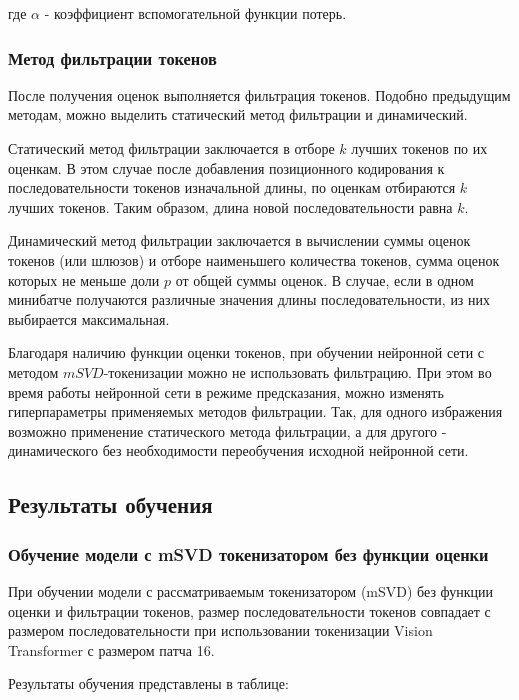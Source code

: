 \documentclass[times,specification,annotation]{itmo-student-thesis}
\begin{document}
где $\alpha$ - коэффициент вспомогательной функции потерь.

\subsubsection{Метод фильтрации токенов}
После получения оценок выполняется фильтрация токенов. Подобно предыдущим методам, можно выделить статический метод фильтрации и динамический.

Статический метод фильтрации заключается в отборе $k$ лучших токенов по их оценкам. В этом случае после добавления позиционного кодирования к последовательности токенов изначальной длины, по оценкам отбираются $k$ лучших токенов. Таким образом, длина новой последовательности равна $k$.

Динамический метод фильтрации заключается в вычислении суммы оценок токенов (или шлюзов) и отборе наименьшего количества токенов, сумма оценок которых не меньше доли $p$ от общей суммы оценок. В случае, если в одном минибатче получаются различные значения длины последовательности, из них выбирается максимальная.

Благодаря наличию функции оценки токенов, при обучении нейронной сети с методом $mSVD$-токенизации можно не использовать фильтрацию. При этом во время работы нейронной сети в режиме предсказания, можно изменять гиперпараметры применяемых методов фильтрации. Так, для одного избражения возможно применение статического метода фильтрации, а для другого - динамического без необходимости переобучения исходной нейронной сети.


\subsection{Результаты обучения}

\subsubsection{Обучение модели с mSVD токенизатором без функции оценки}

При обучении модели с рассматриваемым токенизатором (mSVD) без функции оценки и фильтрации токенов, размер последовательности токенов совпадает с размером последовательности при использовании токенизации Vision Transformer с размером патча 16. 

Результаты обучения представлены в таблице:
\end{document}
